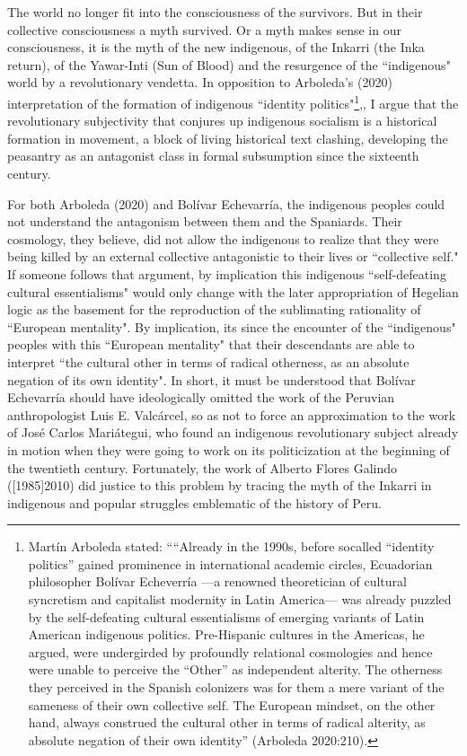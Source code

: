 \documentclass[]{interact}
\theoremstyle{plain}%
\theoremstyle{definition}
\theoremstyle{remark}
\begin{document}
The world no longer fit into the consciousness of the survivors. But in their collective consciousness a myth survived. Or a myth makes sense in our consciousness, it is the myth of the new indigenous, of the Inkarri (the Inka return), of the Yawar-Inti (Sun of Blood) and the resurgence of the “indigenous" world by a revolutionary vendetta. In opposition to Arboleda's (2020) interpretation of the formation of indigenous “identity politics"\footnote{Martín Arboleda stated: ““Already in the 1990s, before socalled “identity politics” gained prominence in international academic circles, Ecuadorian philosopher Bolívar Echeverría —a renowned theoretician of cultural syncretism and capitalist modernity in Latin America— was already puzzled by the self-defeating cultural essentialisms of emerging variants of Latin American indigenous politics. Pre-Hispanic cultures in the Americas, he argued, were undergirded by profoundly relational cosmologies and hence were unable to perceive the “Other” as independent alterity. The otherness they perceived in the Spanish colonizers was for them a mere variant of the sameness of their own collective self. The European mindset, on the other hand, always construed the cultural other in terms of radical alterity, as absolute negation of their own identity” (Arboleda 2020:210).},, I argue that the revolutionary subjectivity that conjures up indigenous socialism is a historical formation in movement, a block of living historical text clashing, developing the peasantry as an antagonist class in formal subsumption since the sixteenth century.

For both Arboleda (2020) and Bolívar Echevarría, the indigenous peoples could not understand the antagonism between them and the Spaniards. Their cosmology, they believe, did not allow the indigenous to realize that they were being killed by an external collective antagonistic to their lives or “collective self." If someone follows that argument, by implication this indigenous “self-defeating cultural essentialisms" would only change with the later appropriation of Hegelian logic as the basement for the reproduction of the sublimating rationality of “European mentality". By implication, its since the encounter of the “indigenous" peoples with this “European mentality" that their descendants are able to interpret “the cultural other in terms of radical otherness, as an absolute negation of its own identity". In short, it must be understood that Bolívar Echevarría should have ideologically omitted the work of the Peruvian anthropologist Luis E. Valcárcel, so as not to force an approximation to the work of José Carlos Mariátegui, who found an indigenous revolutionary subject already in motion when they were going to work on its politicization at the beginning of the twentieth century. Fortunately, the work of Alberto Flores Galindo ([1985]2010) did justice to this problem by tracing the myth of the Inkarri in indigenous and popular struggles emblematic of the history of Peru.
\end{document}
